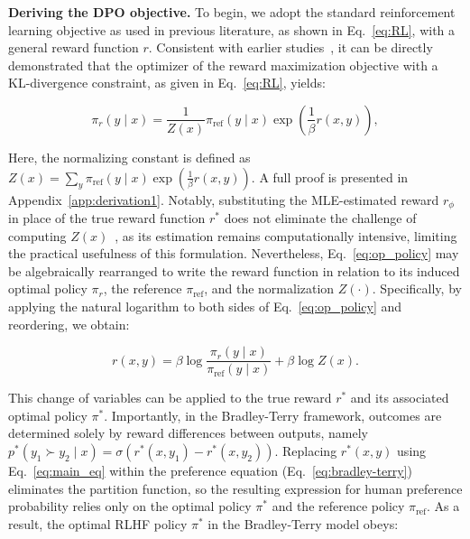 \textbf{Deriving the DPO objective.} To begin, we adopt the standard reinforcement learning objective as used in previous literature, as shown in Eq.~\ref{eq:RL}, with a general reward function $r$. Consistent with earlier studies~\citep{peters2007reinforcement, peng2019advantage, korbak2022reinforcement, go2023aligning}, it can be directly demonstrated that the optimizer of the reward maximization objective with a KL-divergence constraint, as given in Eq.~\ref{eq:RL}, yields:

\begin{equation}\label{eq:op_policy}
    \pi_r(y\mid x) = \frac{1}{Z(x)}\pi_\text{ref}(y\mid x)\exp\left(\frac{1}{\beta}r(x, y)\right),
\end{equation}

Here, the normalizing constant is defined as $Z(x) =\sum_{y}\pi_\text{ref}(y\mid x)\exp\left(\frac{1}{\beta}r(x, y)\right)$. A full proof is presented in Appendix~\ref{app:derivation1}. Notably, substituting the MLE-estimated reward $r_{\phi}$ in place of the true reward function $r^*$ does not eliminate the challenge of computing $Z(x)$~\citep{korbak2022reinforcement, go2023aligning}, as its estimation remains computationally intensive, limiting the practical usefulness of this formulation. Nevertheless, Eq.~\ref{eq:op_policy} may be algebraically rearranged to write the reward function in relation to its induced optimal policy $\pi_r$, the reference $\pi_\text{ref}$, and the normalization $Z(\cdot)$. Specifically, by applying the natural logarithm to both sides of Eq.~\ref{eq:op_policy} and reordering, we obtain:

\begin{equation}\label{eq:main_eq}
    r(x,y) =\beta \log \frac{\pi_r(y\mid x)}{\pi_\text{ref}(y\mid x)} + \beta \log Z(x).
\end{equation}

This change of variables can be applied to the true reward $r^*$ and its associated optimal policy $\pi^*$. Importantly, in the Bradley-Terry framework, outcomes are determined solely by reward differences between outputs, namely ${p^*(y_1 \succ y_2 \mid x) = \sigma(r^*(x, y_1) - r^*(x, y_2))}$. Replacing $r^*(x,y)$ using Eq.~\ref{eq:main_eq} within the preference equation (Eq.~\ref{eq:bradley-terry}) eliminates the partition function, so the resulting expression for human preference probability relies only on the optimal policy $\pi^*$ and the reference policy $\pi_\text{ref}$. As a result, the optimal RLHF policy $\pi^*$ in the Bradley-Terry model obeys:

